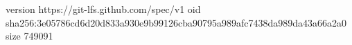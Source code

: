version https://git-lfs.github.com/spec/v1
oid sha256:3e05786cd6d20d833a930e9b99126cba90795a989afc7438da989da43a66a2a0
size 749091
